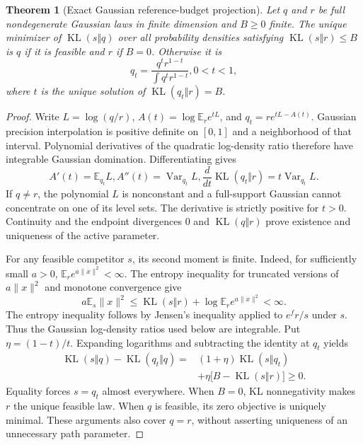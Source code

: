 \documentclass[11pt]{article}
\newtheorem{theorem}{Theorem}[section]
\newcommand{\KL}{\operatorname{KL}}
\newcommand{\E}{\mathbb E}
\newcommand{\Var}{\operatorname{Var}}
\begin{document}
\begin{theorem}[Exact Gaussian reference-budget projection]
\label{thm:projection}
Let $q$ and $r$ be full nondegenerate Gaussian laws in finite dimension and $B\ge0$ finite. The unique minimizer of $\KL(s\Vert q)$ over all probability densities satisfying $\KL(s\Vert r)\le B$ is $q$ if it is feasible and $r$ if $B=0$. Otherwise it is
\begin{equation}
q_t=\frac{q^t r^{1-t}}{\int q^t r^{1-t}}, 0<t<1,
\label{eq:projection}
\end{equation}
where $t$ is the unique solution of $\KL(q_t\Vert r)=B$.
\end{theorem}
\begin{proof}
Write $L=\log(q/r)$, $A(t)=\log\E_r e^{tL}$, and $q_t=r e^{tL-A(t)}$. Gaussian precision interpolation is positive definite on $[0,1]$ and a neighborhood of that interval. Polynomial derivatives of the quadratic log-density ratio therefore have integrable Gaussian domination. Differentiating gives
\begin{equation}
A'(t)=\E_{q_t}L, A''(t)=\Var_{q_t}L,
\frac{d}{dt}\KL(q_t\Vert r)=t\Var_{q_t}L.
\label{eq:monotonicity}
\end{equation}
If $q\ne r$, the polynomial $L$ is nonconstant and a full-support Gaussian cannot concentrate on one of its level sets. The derivative is strictly positive for $t>0$. Continuity and the endpoint divergences $0$ and $\KL(q\Vert r)$ prove existence and uniqueness of the active parameter.

For any feasible competitor $s$, its second moment is finite. Indeed, for sufficiently small $a>0$, $\E_r e^{a\|x\|^2}<\infty$. The entropy inequality for truncated versions of $a\|x\|^2$ and monotone convergence give
\begin{equation}
a\E_s\|x\|^2\le\KL(s\Vert r)+\log\E_r e^{a\|x\|^2}<\infty.
\label{eq:entropybound}
\end{equation}
The entropy inequality follows by Jensen's inequality applied to $e^f r/s$ under $s$. Thus the Gaussian log-density ratios used below are integrable. Put $\eta=(1-t)/t$. Expanding logarithms and subtracting the identity at $q_t$ yields
\begin{equation}
\begin{split}
\KL(s\Vert q)-\KL(q_t\Vert q)
={}&(1+\eta)\KL(s\Vert q_t)\\
&+\eta\bigl[B-\KL(s\Vert r)\bigr]\ge0.
\end{split}
\label{eq:projectionproof}
\end{equation}
Equality forces $s=q_t$ almost everywhere. When $B=0$, KL nonnegativity makes $r$ the unique feasible law. When $q$ is feasible, its zero objective is uniquely minimal. These arguments also cover $q=r$, without asserting uniqueness of an unnecessary path parameter.
\end{proof}
\end{document}
